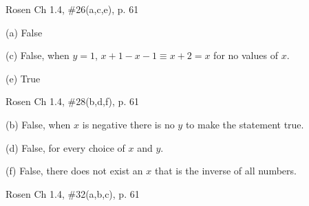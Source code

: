 \documentclass[12pt]{exam}
\newenvironment{my_parts}{
\begin{parts}
    \setlength{\itemsep}{1pt}
    \setlength{\parskip}{0pt}
    \setlength{\parsep}{0pt}
}{\end{parts}}
\newenvironment{my_item}{
\begin{itemize}
    \setlength{\itemsep}{1pt}
    \setlength{\parskip}{0pt}
    \setlength{\parsep}{0pt}
}{\end{itemize}}
\begin{document}
\begin{questions}
\question[6] Rosen Ch 1.4, \#26(a,c,e), p. 61
    \begin{solution}
    \begin{my_item}
        \item[(a)]  False
        \item[(c)]  False, when $y=1$, $x + 1 - x-1 \equiv x + 2 =
        x$ for no values of $x$.
        \item[(e)] True
    \end{my_item}
    \end{solution}


\question[9] Rosen Ch 1.4, \#28(b,d,f), p. 61
    \begin{solution}
    \begin{my_item}
        \item[(b)] False, when $x$ is negative there is no $y$ to
        make the statement true.
        \item[(d)] False, for every choice of $x$ and $y$.
        \item[(f)] False, there does not exist an $x$ that is the inverse of all numbers.
    \end{my_item}
    \end{solution}


\question[9] Rosen Ch 1.4, \#32(a,b,c), p. 61
    \begin{solution}
\end{solution}
\end{questions}
\end{document}

